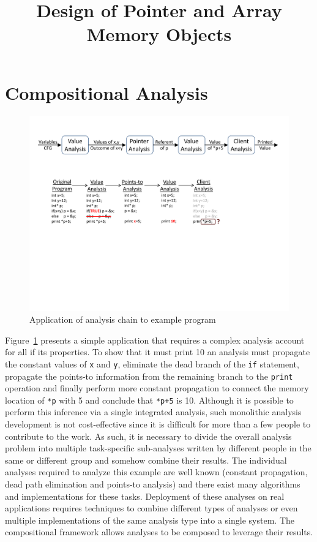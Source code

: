 \documentclass{article}
\begin{document}
\title{Design of Pointer and Array Memory Objects}
\date{}
\maketitle
\section{Compositional Analysis}
\begin{figure}[h!]
\center
\includegraphics[width=6in]{mot_ex_chain.pdf}
\caption{Application of analysis chain to example program}
\label{fig:mot_ex_chain}
\end{figure}

Figure~\ref{fig:mot_ex_chain} presents a simple application that requires a complex analysis account for all if its properties.
To show that it must print 10 an analysis must propagate the constant values of \texttt{x} and \texttt{y}, eliminate the dead branch of the \texttt{if} statement, propagate the points-to information from the remaining branch to the \texttt{print} operation and finally perform more constant propagation to connect the memory location of \texttt{*p} with 5 and conclude that \texttt{*p+5} is 10.
Although it is possible to perform this inference via a single integrated analysis, such monolithic analysis development is not cost-effective since it is difficult for more than a few people to contribute to the work.
As such, it is necessary to divide the overall analysis problem into multiple task-specific sub-analyses written by different people in the same or different group and somehow combine their results.
The individual analyses required to analyze this example are well known (constant propagation, dead path elimination and points-to analysis) and there exist many algorithms and implementations for these tasks.
Deployment of these analyses on real applications requires techniques to combine different types of analyses or even multiple implementations of the same analysis type into a single system.
The compositional framework allows analyses to be composed to leverage their results.
\end{document}
